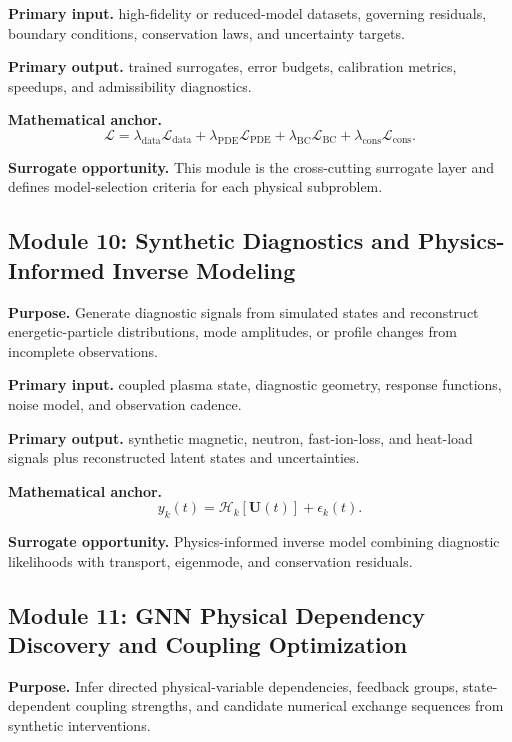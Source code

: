 \documentclass[11pt]{article}
\begin{document}
\textbf{Primary input.} high-fidelity or reduced-model datasets, governing residuals, boundary conditions, conservation laws, and uncertainty targets.

\textbf{Primary output.} trained surrogates, error budgets, calibration metrics, speedups, and admissibility diagnostics.

\textbf{Mathematical anchor.}
\begin{equation}
\mathcal L=\lambda_{\mathrm{data}}\mathcal L_{\mathrm{data}}+\lambda_{\mathrm{PDE}}\mathcal L_{\mathrm{PDE}}+\lambda_{\mathrm{BC}}\mathcal L_{\mathrm{BC}}+\lambda_{\mathrm{cons}}\mathcal L_{\mathrm{cons}}.
\end{equation}

\textbf{Surrogate opportunity.} This module is the cross-cutting surrogate layer and defines model-selection criteria for each physical subproblem.


\subsection{Module 10: Synthetic Diagnostics and Physics-Informed Inverse Modeling}
\textbf{Purpose.} Generate diagnostic signals from simulated states and reconstruct energetic-particle distributions, mode amplitudes, or profile changes from incomplete observations.

\textbf{Primary input.} coupled plasma state, diagnostic geometry, response functions, noise model, and observation cadence.

\textbf{Primary output.} synthetic magnetic, neutron, fast-ion-loss, and heat-load signals plus reconstructed latent states and uncertainties.

\textbf{Mathematical anchor.}
\begin{equation}
y_k(t)=\mathcal H_k[\mathbf U(t)]+\epsilon_k(t).
\end{equation}

\textbf{Surrogate opportunity.} Physics-informed inverse model combining diagnostic likelihoods with transport, eigenmode, and conservation residuals.


\subsection{Module 11: GNN Physical Dependency Discovery and Coupling Optimization}
\textbf{Purpose.} Infer directed physical-variable dependencies, feedback groups, state-dependent coupling strengths, and candidate numerical exchange sequences from synthetic interventions.
\end{document}
